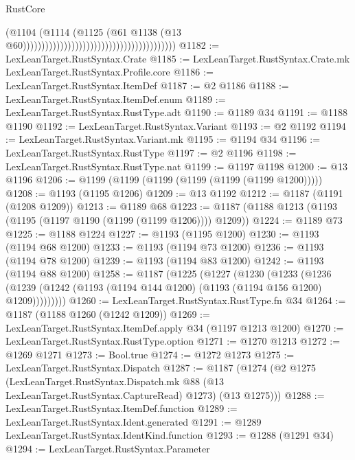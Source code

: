 \begin{lexlean}{RustCore}
\begin{coremodule}
                                                                            (@1104
                                                                              (@1114
                                                                                (@1125
                                                                                  (@61
                                                                                    @1138
                                                                                    (@13
                                                                                      @60)))))))))))))))))))))))))))))))))))))))))
@1182 := LexLeanTarget.RustSyntax.Crate
@1185 := LexLeanTarget.RustSyntax.Crate.mk LexLeanTarget.RustSyntax.Profile.core
@1186 := LexLeanTarget.RustSyntax.ItemDef
@1187 := @2 @1186
@1188 := LexLeanTarget.RustSyntax.ItemDef.enum
@1189 := LexLeanTarget.RustSyntax.RustType.adt
@1190 := @1189 @34
@1191 := @1188 @1190
@1192 := LexLeanTarget.RustSyntax.Variant
@1193 := @2 @1192
@1194 := LexLeanTarget.RustSyntax.Variant.mk
@1195 := @1194 @34
@1196 := LexLeanTarget.RustSyntax.RustType
@1197 := @2 @1196
@1198 := LexLeanTarget.RustSyntax.RustType.nat
@1199 := @1197 @1198
@1200 := @13 @1196
@1206 := @1199 (@1199 (@1199 (@1199 (@1199 (@1199 @1200)))))
@1208 := @1193 (@1195 @1206)
@1209 := @13 @1192
@1212 := @1187 (@1191 (@1208 @1209))
@1213 := @1189 @68
@1223 := @1187 (@1188 @1213 (@1193 (@1195 (@1197 @1190 (@1199 (@1199 @1206)))) @1209))
@1224 := @1189 @73
@1225 := @1188 @1224
@1227 := @1193 (@1195 @1200)
@1230 := @1193 (@1194 @68 @1200)
@1233 := @1193 (@1194 @73 @1200)
@1236 := @1193 (@1194 @78 @1200)
@1239 := @1193 (@1194 @83 @1200)
@1242 := @1193 (@1194 @88 @1200)
@1258 := @1187
    (@1225
      (@1227
        (@1230
          (@1233
            (@1236 (@1239 (@1242 (@1193 (@1194 @144 @1200) (@1193 (@1194 @156 @1200) @1209)))))))))
@1260 := LexLeanTarget.RustSyntax.RustType.fn @34
@1264 := @1187 (@1188 @1260 (@1242 @1209))
@1269 := LexLeanTarget.RustSyntax.ItemDef.apply @34 (@1197 @1213 @1200)
@1270 := LexLeanTarget.RustSyntax.RustType.option
@1271 := @1270 @1213
@1272 := @1269 @1271
@1273 := Bool.true
@1274 := @1272 @1273
@1275 := LexLeanTarget.RustSyntax.Dispatch
@1287 := @1187
    (@1274
      (@2
        @1275
        (LexLeanTarget.RustSyntax.Dispatch.mk @88 (@13 LexLeanTarget.RustSyntax.CaptureRead) @1273)
        (@13 @1275)))
@1288 := LexLeanTarget.RustSyntax.ItemDef.function
@1289 := LexLeanTarget.RustSyntax.Ident.generated
@1291 := @1289 LexLeanTarget.RustSyntax.IdentKind.function
@1293 := @1288 (@1291 @34)
@1294 := LexLeanTarget.RustSyntax.Parameter

\end{coremodule}
\end{lexlean}
